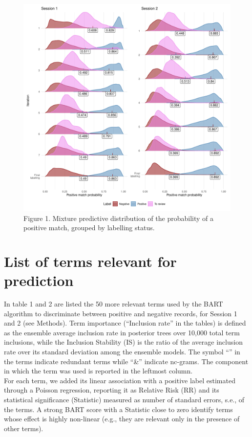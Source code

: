 \documentclass[
]{article}
\begin{document}
\begin{figure}
\centering
\includegraphics{S2.Additional_outputs_files/figure-latex/posterior distributions-1.pdf}
\caption{Figure 1. Mixture predictive distribution of the probability of
a positive match, grouped by labelling status.}
\end{figure}

\hypertarget{list-of-terms-relevant-for-prediction}{%
\section{List of terms relevant for
prediction}\label{list-of-terms-relevant-for-prediction}}

In table 1 and 2 are listed the 50 more relevant terms used by the BART
algorithm to discriminate between positive and negative records, for
Session 1 and 2 (see Methods). Term importance (``Inclusion rate'' in
the tables) is defined as the ensemble average inclusion rate in
posterior trees over 10,000 total term inclusions, while the Inclusion
Stability (IS) is the ratio of the average inclusion rate over its
standard deviation among the ensemble models. The symbol ``\textbar{}''
in the terms indicate redundant terms while ``\&'' indicate nc-grams.
The component in which the term was used is reported in the leftmost
column.\\
For each term, we added its linear association with a positive label
estimated through a Poisson regression, reporting it as Relative Risk
(RR) and its statistical significance (Statistic) measured as number of
standard errors, s.e., of the terms. A strong BART score with a
Statistic close to zero identify terms whose effect is highly non-linear
(e.g., they are relevant only in the presence of other terms).
\end{document}
